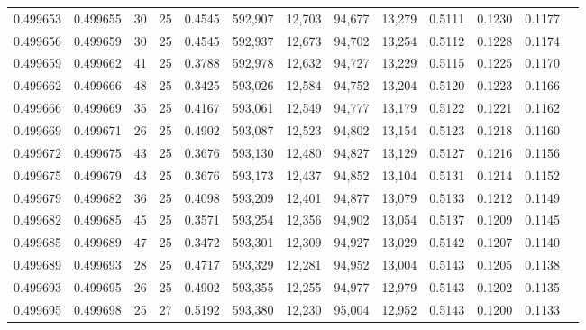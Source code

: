 \begin{tabular}{rrrrrrrrrrrrr}
0.499653 & 0.499655 &    30 &  25 &                                     0.4545 & 592,907 &  12,703 &  94,677 &  13,279 & 0.5111 & 0.1230 & 0.1177 \\
0.499656 & 0.499659 &    30 &  25 &                                     0.4545 & 592,937 &  12,673 &  94,702 &  13,254 & 0.5112 & 0.1228 & 0.1174 \\
0.499659 & 0.499662 &    41 &  25 &                                     0.3788 & 592,978 &  12,632 &  94,727 &  13,229 & 0.5115 & 0.1225 & 0.1170 \\
0.499662 & 0.499666 &    48 &  25 &                                     0.3425 & 593,026 &  12,584 &  94,752 &  13,204 & 0.5120 & 0.1223 & 0.1166 \\
0.499666 & 0.499669 &    35 &  25 &                                     0.4167 & 593,061 &  12,549 &  94,777 &  13,179 & 0.5122 & 0.1221 & 0.1162 \\
0.499669 & 0.499671 &    26 &  25 &                                     0.4902 & 593,087 &  12,523 &  94,802 &  13,154 & 0.5123 & 0.1218 & 0.1160 \\
0.499672 & 0.499675 &    43 &  25 &                                     0.3676 & 593,130 &  12,480 &  94,827 &  13,129 & 0.5127 & 0.1216 & 0.1156 \\
0.499675 & 0.499679 &    43 &  25 &                                     0.3676 & 593,173 &  12,437 &  94,852 &  13,104 & 0.5131 & 0.1214 & 0.1152 \\
0.499679 & 0.499682 &    36 &  25 &                                     0.4098 & 593,209 &  12,401 &  94,877 &  13,079 & 0.5133 & 0.1212 & 0.1149 \\
0.499682 & 0.499685 &    45 &  25 &                                     0.3571 & 593,254 &  12,356 &  94,902 &  13,054 & 0.5137 & 0.1209 & 0.1145 \\
0.499685 & 0.499689 &    47 &  25 &                                     0.3472 & 593,301 &  12,309 &  94,927 &  13,029 & 0.5142 & 0.1207 & 0.1140 \\
0.499689 & 0.499693 &    28 &  25 &                                     0.4717 & 593,329 &  12,281 &  94,952 &  13,004 & 0.5143 & 0.1205 & 0.1138 \\
0.499693 & 0.499695 &    26 &  25 &                                     0.4902 & 593,355 &  12,255 &  94,977 &  12,979 & 0.5143 & 0.1202 & 0.1135 \\
0.499695 & 0.499698 &    25 &  27 &                                     0.5192 & 593,380 &  12,230 &  95,004 &  12,952 & 0.5143 & 0.1200 & 0.1133 \\

\end{tabular}
